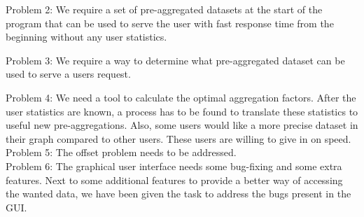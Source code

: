 Problem 2: We require a set of pre-aggregated datasets at the start of the program that can be used to serve the user with fast response time from the beginning without any user statistics.

Problem 3: We require a way to determine what pre-aggregated dataset can be used to serve a users request.


Problem 4: We need a tool to calculate the optimal aggregation factors.
After the user statistics are known, a process has to be found to translate these statistics to useful new pre-aggregations. Also, some users would like a more precise dataset in their graph compared to other users. These users are willing to give in on speed.\\

Problem 5: The offset problem needs to be addressed.\\

Problem 6: The graphical user interface needs some bug-fixing and some extra features.
Next to some additional features to provide a better way of accessing the wanted data, we have been given the task to address the bugs present in the GUI.
